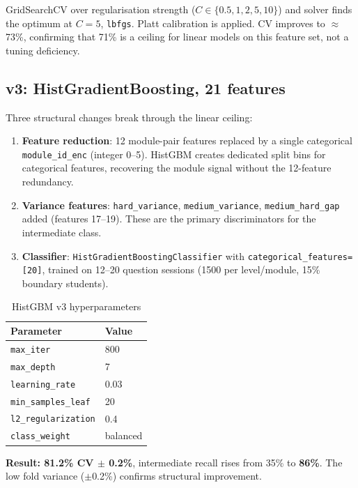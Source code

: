 \documentclass[12pt,a4paper]{article}
\begin{document}
GridSearchCV over regularisation strength ($C \in \{0.5, 1, 2, 5, 10\}$) and solver
finds the optimum at $C=5$, \texttt{lbfgs}. Platt calibration is applied.
CV improves to $\approx$73\%, confirming that 71\% is a ceiling for linear models
on this feature set, not a tuning deficiency.

\subsection{v3: HistGradientBoosting, 21 features}
\label{sec:v3}

Three structural changes break through the linear ceiling:

\begin{enumerate}[noitemsep]
  \item \textbf{Feature reduction}: 12 module-pair features replaced by a single
        categorical \texttt{module\_id\_enc} (integer 0--5). HistGBM creates
        dedicated split bins for categorical features, recovering the module signal
        without the 12-feature redundancy.
  \item \textbf{Variance features}: \texttt{hard\_variance}, \texttt{medium\_variance},
        \texttt{medium\_hard\_gap} added (features 17--19). These are the primary
        discriminators for the intermediate class.
  \item \textbf{Classifier}: \texttt{HistGradientBoostingClassifier} with
        \texttt{categorical\_features=[20]}, trained on 12--20 question sessions
        (1500 per level/module, 15\% boundary students).
\end{enumerate}

\begin{table}[H]
\centering
\caption{HistGBM v3 hyperparameters}
\begin{tabular}{@{}ll@{}}
\toprule
Parameter & Value \\
\midrule
\texttt{max\_iter}          & 800 \\
\texttt{max\_depth}         & 7 \\
\texttt{learning\_rate}     & 0.03 \\
\texttt{min\_samples\_leaf} & 20 \\
\texttt{l2\_regularization} & 0.4 \\
\texttt{class\_weight}      & balanced \\
\bottomrule
\end{tabular}
\end{table}

\textbf{Result: 81.2\% CV $\pm$ 0.2\%}, intermediate recall rises from 35\% to
\textbf{86\%}. The low fold variance ($\pm$0.2\%) confirms structural improvement.
\end{document}
